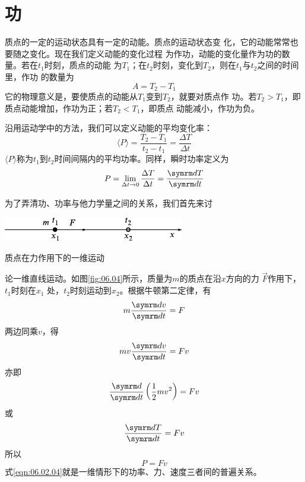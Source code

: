 \section{功}\label{sec:06.02}

质点的一定的运动状态具有一定的动能。质点的运动状态变
化，它的动能常常也要随之变化。现在我们定义动能的变化过程
为作功，动能的变化量作为功的数量。若在$ t_1 $时刻，质点的动能
为$ T _ { 1 } $；在$ t_2 $时刻，变化到$ T_2 $，则在$ t _ { 1 } $与$ t _ { 2 } $之间的时间里，作功
的数量为\vspace{-1.56em}
\begin{equation}\label{eqn:06.02.01}
  A = T _ { 2 } - T _ { 1 }
\end{equation}
它的物理意义是，要使质点的动能从$ T_1 $变到$ T_2 $，就要对质点作
功。若$ T _ { 2 } > T _ { 1 } $，即质点动能增加，作功为正；若$ T _ { 2 } < T _ { 1 } $，即质点
动能减小，作功为负。

沿用运动学中的方法，我们可以定义动能的平均变化率：
\begin{equation}\label{eqn:06.02.02}
  \langle P \rangle = \frac { T _ { 2 } - T _ { 1 } } { t _ { 2 } - t _ { 1 } } = \frac { \Delta T } { \Delta t }
\end{equation}
$ \langle P \rangle $称为$ t _ { 1 } $到$ t _ { 2 } $时间间隔内的平均功率。同样，瞬时功率定义为
\begin{equation}\label{eqn:06.02.03}
  P = \lim _ { \Delta t \to 0 } \frac { \Delta T } { \Delta t } = \frac { \dif T } { \dif t }
\end{equation}

为了弄清功、功率与他力学量之间的关系，我们首先来讨
\begin{figurex}
  \centering
  \includegraphics{figure/fig06.04}
  \caption{质点在力作用下的一维运动}
  \label{fig:06.04}
\end{figurex}
论一维直线运动。如图\ref{fig:06.04}\;所示，质量为$ m $的质点在沿$ x $方向的力
$ \vec{F} $作用下，$ t _ { 1 } $时刻在$ x _ { 1 } $ 处，$ t _ { 2 } $时刻运动到$ x _ 2 $。根据牛顿第二定律，有
\begin{equation*}
  m \frac { \dif v } { \dif t } = F
\end{equation*}
两边同乘$ v $，得
\begin{equation*}
  m v \frac { \dif v } { \dif t } = F v
\end{equation*}
亦即\vspace{-1.56em}
\begin{equation*}
  \frac { \dif } { \dif t } \left( \frac { 1 } { 2 } m v ^ { 2 } \right) = F v
\end{equation*}
或\vspace{-1.56em}
\begin{equation*}
  \frac { \dif T } { \dif t } = F v
\end{equation*}
所以\vspace{-1.56em}
\begin{equation}\label{eqn:06.02.04}
  P = F v
\end{equation}
式\eqref{eqn:06.02.04}就是一维情形下的功率、力、速度三者间的普遍关系。

